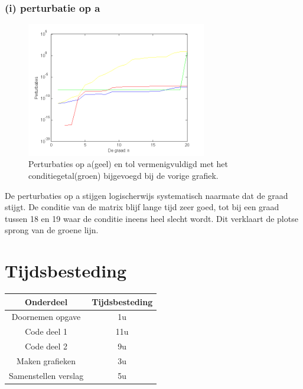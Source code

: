 \documentclass[11pt,a4paper]{article}
\begin{document}
\subsubsection*{(i) perturbatie op a}
\vspace{-20pt}
\begin{figure}[H]
	\centering
	\includegraphics[width=0.7\textwidth]{22i1.png}
	\vspace{-10pt}
	\caption*{Perturbaties op a(geel) en tol vermenigvuldigd met het conditiegetal(groen) bijgevoegd bij de vorige grafiek.}
	\end{figure}
\vspace{-10pt}
De perturbaties op a stijgen logischerwijs systematisch naarmate dat de graad stijgt. De conditie van de matrix blijf lange tijd zeer goed, tot bij een graad tussen 18 en 19 waar de conditie ineens heel slecht wordt. Dit verklaart de plotse sprong van de groene lijn.
\vspace{-5pt}
\section{Tijdsbesteding}
\begin{center}
\begin{tabular}{ c || c }
Onderdeel & Tijdsbesteding\\
\hline
\hline
Doornemen opgave & 1u\\
\hline
Code deel 1 & 11u\\
\hline
Code deel 2 & 9u\\
\hline
Maken grafieken & 3u\\
\hline
Samenstellen verslag & 5u
\end{tabular}
\end{center}
\end{document}
